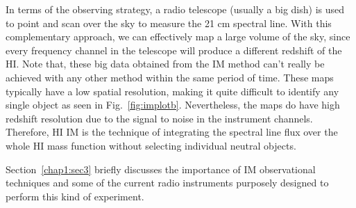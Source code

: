 \FloatBarrier

In terms of the observing strategy, a radio telescope (usually a big dish) is used to point and scan over the sky to measure the 21 cm spectral line. With this complementary approach, we can effectively map a large volume of the sky, since every frequency channel in the telescope will produce a different redshift of the HI. Note that, these big data obtained from the IM method can't really be achieved with any other method within the same period of time. These maps typically have a low spatial resolution, making it quite difficult to identify any single object as seen in Fig.~\ref{fig:implotb}. Nevertheless, the maps do have high redshift resolution due to the signal to noise in the instrument channels. Therefore, HI IM is the technique of integrating the spectral line flux over the whole HI mass function without selecting individual neutral objects.

Section~\ref{chap1:sec3} briefly discusses the importance of IM observational techniques and some of the current radio instruments purposely designed to perform this kind of experiment. 


% 
